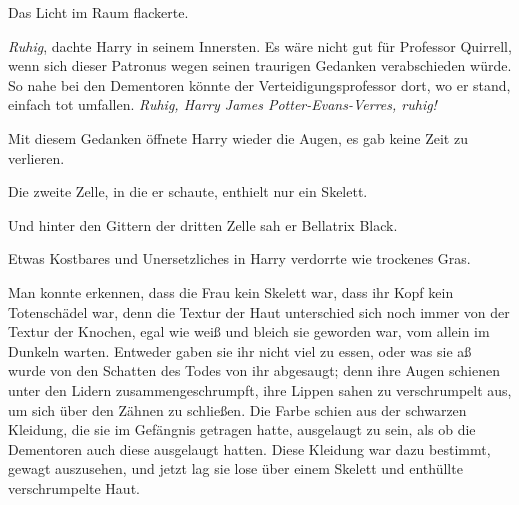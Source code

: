 Das Licht im Raum flackerte.

\emph{Ruhig}, dachte Harry in seinem Innersten. Es wäre nicht gut für Professor Quirrell, wenn sich dieser Patronus wegen seinen traurigen Gedanken verabschieden würde. So nahe bei den Dementoren könnte der Verteidigungsprofessor dort, wo er stand, einfach tot umfallen. \emph{Ruhig, Harry James Potter-Evans-Verres, ruhig!}

Mit diesem Gedanken öffnete Harry wieder die Augen, es gab keine Zeit zu verlieren.

Die zweite Zelle, in die er schaute, enthielt nur ein Skelett.

Und hinter den Gittern der dritten Zelle sah er Bellatrix Black.

Etwas Kostbares und Unersetzliches in Harry verdorrte wie trockenes Gras.

Man konnte erkennen, dass die Frau kein Skelett war, dass ihr Kopf kein Totenschädel war, denn die Textur der Haut unterschied sich noch immer von der Textur der Knochen, egal wie weiß und bleich sie geworden war, vom allein im Dunkeln warten. Entweder gaben sie ihr nicht viel zu essen, oder was sie aß wurde von den Schatten des Todes von ihr abgesaugt; denn ihre Augen schienen unter den Lidern zusammengeschrumpft, ihre Lippen sahen zu verschrumpelt aus, um sich über den Zähnen zu schließen. Die Farbe schien aus der schwarzen Kleidung, die sie im Gefängnis getragen hatte, ausgelaugt zu sein, als ob die Dementoren auch diese ausgelaugt hatten. Diese Kleidung war dazu bestimmt, gewagt auszusehen, und jetzt lag sie lose über einem Skelett und enthüllte verschrumpelte Haut.

